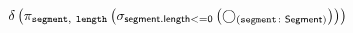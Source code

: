 \documentclass[varwidth=100cm,convert={density=120}]{standalone}
\begin{document}
\begin{preview}
$\duplicateelimination \left(\projection{\var{segment},~\var{length}} \left(\selection{segment.length <= 0} \left(\getvertices{segment}{Segment}\right)\right)\right)$
\end{preview}
\end{document}
